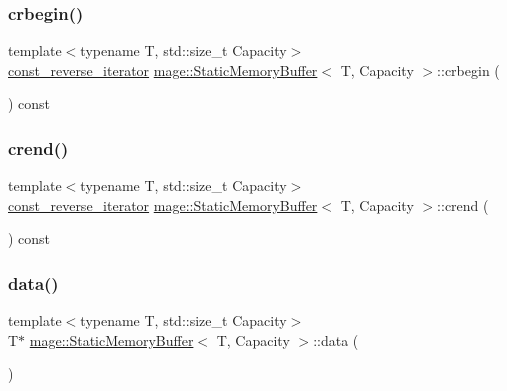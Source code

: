 \subsubsection{\texorpdfstring{crbegin()}{crbegin()}}
{\footnotesize\ttfamily template$<$typename T, std\+::size\+\_\+t Capacity$>$ \\
\mbox{\hyperlink{classmage_1_1_static_memory_buffer_afcde56a284e78597f2b331fc9bf379e8}{const\+\_\+reverse\+\_\+iterator}} \mbox{\hyperlink{classmage_1_1_static_memory_buffer}{mage\+::\+Static\+Memory\+Buffer}}$<$ T, Capacity $>$\+::crbegin (\begin{DoxyParamCaption}{ }\end{DoxyParamCaption}) const\hspace{0.3cm}{\ttfamily [noexcept]}}

\mbox{\label{classmage_1_1_static_memory_buffer_a2976a7c1d9dcb6c5e011b5bf52ac6823}} 
\subsubsection{\texorpdfstring{crend()}{crend()}}
{\footnotesize\ttfamily template$<$typename T, std\+::size\+\_\+t Capacity$>$ \\
\mbox{\hyperlink{classmage_1_1_static_memory_buffer_afcde56a284e78597f2b331fc9bf379e8}{const\+\_\+reverse\+\_\+iterator}} \mbox{\hyperlink{classmage_1_1_static_memory_buffer}{mage\+::\+Static\+Memory\+Buffer}}$<$ T, Capacity $>$\+::crend (\begin{DoxyParamCaption}{ }\end{DoxyParamCaption}) const\hspace{0.3cm}{\ttfamily [noexcept]}}

\mbox{\label{classmage_1_1_static_memory_buffer_a0a4c4fbfe3d529b12b8c0622e3d03e16}} 
\subsubsection{\texorpdfstring{data()}{data()}\hspace{0.1cm}{\footnotesize\ttfamily [1/2]}}
{\footnotesize\ttfamily template$<$typename T, std\+::size\+\_\+t Capacity$>$ \\
T$\ast$ \mbox{\hyperlink{classmage_1_1_static_memory_buffer}{mage\+::\+Static\+Memory\+Buffer}}$<$ T, Capacity $>$\+::data (\begin{DoxyParamCaption}{ }\end{DoxyParamCaption})\hspace{0.3cm}{\ttfamily [noexcept]}}

